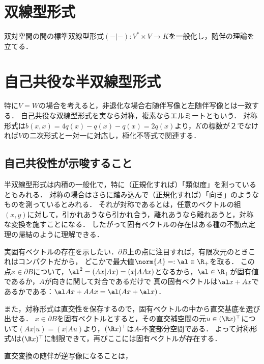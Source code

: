 \documentclass[uplatex,dvipdfmx]{jsreport}
\begin{document}
\section{双線型形式}

\begin{tcolorbox}[colframe=ForestGreen, colback=ForestGreen!10!white,breakable,colbacktitle=ForestGreen!40!white,coltitle=black,fonttitle=\bfseries\sffamily,
title=]
    双対空間の間の標準双線型形式$(-|-):V^*\times V\to K$を一般化し，随伴の理論を立てる．
\end{tcolorbox}


\section{自己共役な半双線型形式}

\begin{tcolorbox}[colframe=ForestGreen, colback=ForestGreen!10!white,breakable,colbacktitle=ForestGreen!40!white,coltitle=black,fonttitle=\bfseries\sffamily,
title=]
    特に$V=W$の場合を考えると，非退化な場合右随伴写像と左随伴写像とは一致する．
    自己共役な双線型形式を実なら対称，複素ならエルミートともいう．
    対称形式は$b(x,x)=4q(x)-q(x)-q(x)=2q(x)$より，$K$の標数が２でなければ$V$の二次形式と一対一に対応し，極化不等式で関連する．
\end{tcolorbox}

\subsection{自己共役性が示唆すること}

\begin{remarks}
    半双線型形式は内積の一般化で，特に（正規化すれば）「類似度」を測っているともみれる．
    対称の場合はさらに踏み込んで（正規化すれば）「向き」のようなものを測っているとみれる．
    それが対称であるとは，任意のベクトルの組$(x,y)$に対して，引かれあうなら引かれ合う，離れあうなら離れあうと，対称な変換を施すことになる．
    したがって固有ベクトルの存在はある種の不動点定理の帰結のように理解できる．

    実固有ベクトルの存在を示したい．$\partial B$上の点に注目すれば，有限次元のときこれはコンパクトだから，
    どこかで最大値$\norm{A}=:\al\in\R_+$を取る．
    この点$x\in\partial B$について，$\al^2=(Ax|Ax)=(x|AAx)$となるから，$\al\in\R_+$が固有値であるか，$A$が向きに関して対合であるだけで
    真の固有ベクトルは$\al x+Ax$であるかである：$\al Ax+AAx=\al(Ax+\al x)$．

    また，対称形式は直交性を保存するので，固有ベクトルの中から直交基底を選び出せる．
    $x\in\partial B$を固有ベクトルとすると，その直交補空間の元$u\in (\R x)^\top$について$(Ax|u)=(x|Au)$より，$(\R x)^\top$は$A$-不変部分空間である．
    よって対称形式$b$は$(\R x)^\top$に制限できて，再びここには固有ベクトルが存在する．

    直交変換の随伴が逆写像になることは，
\end{remarks}
\end{document}
